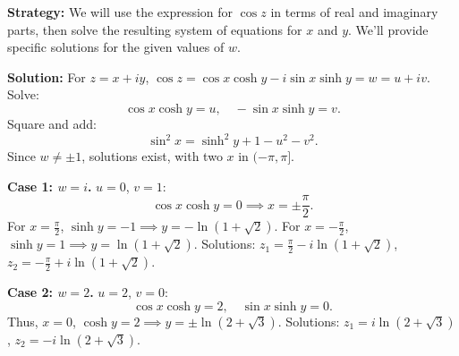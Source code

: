 \noindent\textbf{Strategy:} We will use the expression for $\cos z$ in terms of real and imaginary parts, then solve the resulting system of equations for $x$ and $y$. We'll provide specific solutions for the given values of $w$.

\bigskip\noindent\textbf{Solution:}
For \( z = x + iy \), \( \cos z = \cos x \cosh y - i \sin x \sinh y = w = u + iv \). Solve:
\[
\cos x \cosh y = u, \quad -\sin x \sinh y = v.
\]
Square and add:
\[
\sin^2 x = \sinh^2 y + 1 - u^2 - v^2.
\]
Since \( w \neq \pm 1 \), solutions exist, with two \( x \) in \( (-\pi, \pi] \).

\textbf{Case 1: \( w = i \).} \( u = 0 \), \( v = 1 \):
\[
\cos x \cosh y = 0 \implies x = \pm \frac{\pi}{2}.
\]
For \( x = \frac{\pi}{2} \), \( \sinh y = -1 \implies y = -\ln(1 + \sqrt{2}) \).
For \( x = -\frac{\pi}{2} \), \( \sinh y = 1 \implies y = \ln(1 + \sqrt{2}) \).
Solutions: \( z_1 = \frac{\pi}{2} - i \ln(1 + \sqrt{2}) \), \( z_2 = -\frac{\pi}{2} + i \ln(1 + \sqrt{2}) \).

\textbf{Case 2: \( w = 2 \).} \( u = 2 \), \( v = 0 \):
\[
\cos x \cosh y = 2, \quad \sin x \sinh y = 0.
\]
Thus, \( x = 0 \), \( \cosh y = 2 \implies y = \pm \ln(2 + \sqrt{3}) \).
Solutions: \( z_1 = i \ln(2 + \sqrt{3}) \), \( z_2 = -i \ln(2 + \sqrt{3}) \).

